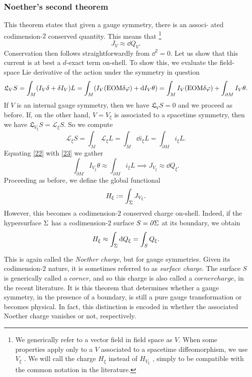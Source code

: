 \subsubsection*{Noether's second theorem}
This theorem states that given a gauge symmetry, there is an associ-
ated codimension-$2$ conserved quantity. This means that \footnote{We generically refer to a vector field in field space as $V$. When some properties apply only to a $V$ associated to a spacetime diffeomorphism, we use $V_\xi $ . We will call the charge $H_\xi $ instead of $H_{V_\xi }$ , simply to be compatible with the common notation in the literature.}
\begin{equation}\label{21}
	J_V\approx \dd Q_V.
\end{equation}
Conservation then follows straightforwardly from $\dd^2=0$. Let us show that this current is at best a $d$-exact term on-shell. To show this, we evaluate the field-space Lie derivative of the action under the symmetry in question
\begin{equation}\label{22}
	\mathfrak{L}_VS=\int_M(I_V\d +\d I_V)L=\int_M(I_V(\text{EOM}\d\varphi)+\dd I_V\theta)=\int_MI_V(\text{EOM}\d\varphi)+\int_{\partial M}I_V\theta.
\end{equation}
If $V$ is an internal gauge symmetry, then we have $\mathfrak{L}_VS=0$ and we proceed as before. If, on the other hand, $V=V_\xi $ is associated to a spacetime symmetry, then we have $\mathfrak{L}_{V_\xi }S=\mathcal{L}_\xi S$. So we compute
\begin{equation}\label{23}
	\mathcal{L}_\xi S=\int_M\mathcal{L}_\xi L=\int_M\dd i_\xi L=\int_{\partial M}i_\xi L.
\end{equation}
Equating \eqref{22} with \eqref{23} we gather
\begin{equation}\label{24}
	\int_{\partial M}I_{V_\xi }\theta\approx\int_{\partial M}i_\xi L\implies J_{V_\xi }\approx \dd Q_\xi .
\end{equation}
Proceeding as before, we define the global functional
\begin{equation}\label{25}
	H_\xi :=\int_\S J_{V_\xi }.
\end{equation}
However, this becomes a codimension-$2$ conserved charge on-shell. Indeed, if the hypersurface $\S $ has a codimension-$2$ surface $S=\partial\S $ at its boundary, we obtain
\begin{equation}\label{26}
	H_\xi \approx \int_\S \dd Q_\xi =\int_S Q_\xi .
\end{equation}

This is again called the \textit{Noether charge}, but for gauge symmetries. Given its codimension-$2$ nature, it is sometimes referred to as \textit{surface charge}. The surface $S$ is generically called a $corner$, and so this charge is also called a $corner charge$, in the recent literature. It is this theorem that determines whether a gauge symmetry, in the presence of a boundary, is still a pure gauge transformation or becomes physical. In fact, this distinction is encoded in whether the associated Noether charge vanishes or not, respectively.

